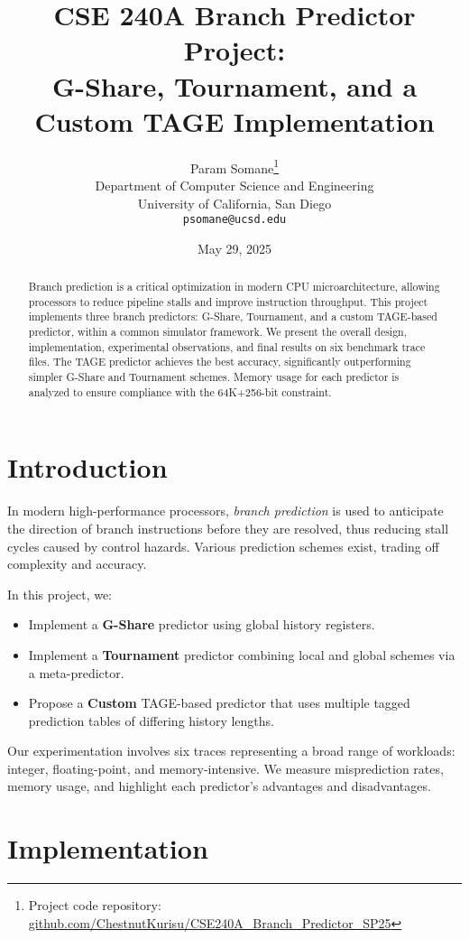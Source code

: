 \documentclass[11pt]{article}
\title{CSE 240A Branch Predictor Project:\\
G-Share, Tournament, and a Custom TAGE Implementation}
\author{%
  Param Somane\thanks{Project code repository:
  \href{https://github.com/ChestnutKurisu/CSE240A_Branch_Predictor_SP25/}%
       {github.com/ChestnutKurisu/CSE240A\_Branch\_Predictor\_SP25}}\\
  Department of Computer Science and Engineering \\
  University of California, San Diego \\
  \texttt{psomane@ucsd.edu}
}
\date{May 29, 2025}
\begin{document}
\maketitle

\begin{abstract}
Branch prediction is a critical optimization in modern CPU microarchitecture, allowing processors to reduce pipeline stalls and improve instruction throughput. This project implements three branch predictors: G-Share, Tournament, and a custom TAGE-based predictor, within a common simulator framework. We present the overall design, implementation, experimental observations, and final results on six benchmark trace files. The TAGE predictor achieves the best accuracy, significantly outperforming simpler G-Share and Tournament schemes. Memory usage for each predictor is analyzed to ensure compliance with the 64K+256-bit constraint.
\end{abstract}

\vspace{1em}

\section{Introduction}
In modern high-performance processors, \emph{branch prediction} is used to anticipate the direction of branch instructions before they are resolved, thus reducing stall cycles caused by control hazards. Various prediction schemes exist, trading off complexity and accuracy.

In this project, we:
\begin{itemize}
    \item Implement a \textbf{G-Share} predictor using global history registers.
    \item Implement a \textbf{Tournament} predictor combining local and global schemes via a meta-predictor.
    \item Propose a \textbf{Custom} TAGE-based predictor that uses multiple tagged prediction tables of differing history lengths.
\end{itemize}
Our experimentation involves six traces representing a broad range of workloads: integer, floating-point, and memory-intensive. We measure misprediction rates, memory usage, and highlight each predictor's advantages and disadvantages.

\section{Implementation}
\end{document}
